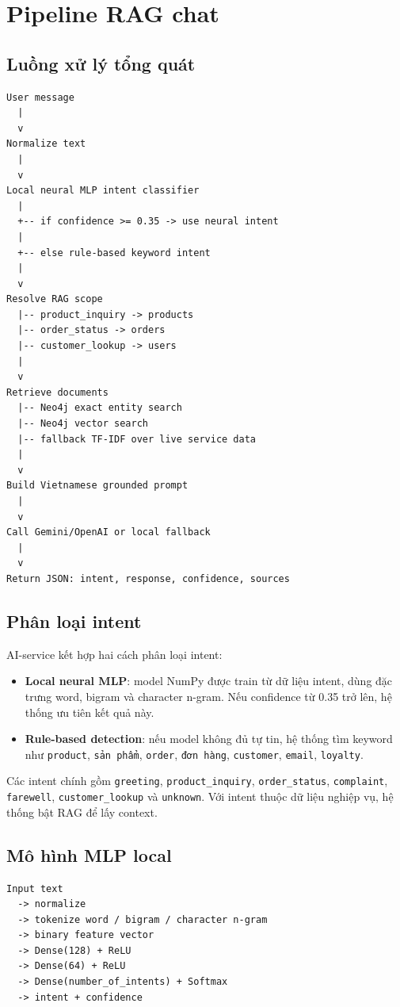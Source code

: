 \documentclass[12pt,a4paper]{report}
\begin{document}
\section{Pipeline RAG chat}
\subsection{Luồng xử lý tổng quát}
\begin{lstlisting}[style=code,caption={Pipeline RAG chat}]
User message
  |
  v
Normalize text
  |
  v
Local neural MLP intent classifier
  |
  +-- if confidence >= 0.35 -> use neural intent
  |
  +-- else rule-based keyword intent
  |
  v
Resolve RAG scope
  |-- product_inquiry -> products
  |-- order_status -> orders
  |-- customer_lookup -> users
  |
  v
Retrieve documents
  |-- Neo4j exact entity search
  |-- Neo4j vector search
  |-- fallback TF-IDF over live service data
  |
  v
Build Vietnamese grounded prompt
  |
  v
Call Gemini/OpenAI or local fallback
  |
  v
Return JSON: intent, response, confidence, sources
\end{lstlisting}

\subsection{Phân loại intent}
AI-service kết hợp hai cách phân loại intent:
\begin{itemize}
  \item \textbf{Local neural MLP}: model NumPy được train từ dữ liệu intent, dùng đặc trưng word, bigram và character n-gram. Nếu confidence từ 0.35 trở lên, hệ thống ưu tiên kết quả này.
  \item \textbf{Rule-based detection}: nếu model không đủ tự tin, hệ thống tìm keyword như \texttt{product}, \texttt{sản phẩm}, \texttt{order}, \texttt{đơn hàng}, \texttt{customer}, \texttt{email}, \texttt{loyalty}.
\end{itemize}

Các intent chính gồm \texttt{greeting}, \texttt{product\_inquiry}, \texttt{order\_status}, \texttt{complaint}, \texttt{farewell}, \texttt{customer\_lookup} và \texttt{unknown}. Với intent thuộc dữ liệu nghiệp vụ, hệ thống bật RAG để lấy context.

\subsection{Mô hình MLP local}
\begin{lstlisting}[style=code,caption={Kiến trúc intent classifier local}]
Input text
  -> normalize
  -> tokenize word / bigram / character n-gram
  -> binary feature vector
  -> Dense(128) + ReLU
  -> Dense(64) + ReLU
  -> Dense(number_of_intents) + Softmax
  -> intent + confidence
\end{lstlisting}
\end{document}

